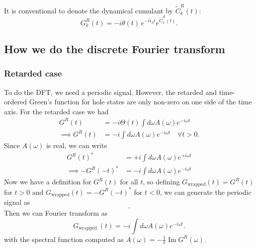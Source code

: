 It is conventional to denote the dynamical cumulant by $\tilde{C}_k^R(t)$:
\begin{equation}
G_k^R(t) = -i\theta(t)\, e^{-i \tilde{\epsilon}_k t} e^{\tilde{C}_k^R(t)}.
\end{equation}

\subsection{How we do the discrete Fourier transform}
\subsubsection{Retarded case}
\label{sec:ce-dft-retarded}
To do the DFT, we need a periodic signal. However, the retarded and time-ordered Green's function for hole states are only non-zero on one side of the time axis. For the retarded case we had 
\begin{align}
G^R(t)&=-i \Theta(t) \int d \omega A(\omega) e^{-i \omega t}\\
\implies G^R(t)&=-i \int d \omega A(\omega) e^{-i \omega t}\quad\forall t>0.
\end{align}
Since $A(\omega)$ is real, we can write
\begin{align}
    G^R(t)^*&=+i \int d \omega A(\omega) e^{+i \omega t}\\
\implies -G^R(-t)^*&=-i \int d \omega A(\omega) e^{-i \omega t}
\end{align}
Now we have a definition for $G^R(t)$ for all $t$, so defining $G_{\text{wrapped}}(t) = G^R(t)$ for $t>0$ and $G_{\text{wrapped}}(t) = -G^R(-t)^*$ for $t<0$, we can generate the periodic signal as
\begin{equation}
    [G^R(0), G^R(dt), \ldots, G^R(N dt), -G^R(-N dt)^*, \ldots, -G^R(-dt)^*].
\end{equation}
Then we can Fourier transform as
\begin{equation}
    G_{\text {wrapped }}(t)=-i \int d \omega A(\omega) e^{-i \omega t}.
\end{equation}
with the spectral function computed as $A(\omega) = -\frac{1}{\pi} \operatorname{Im} G^R(\omega)$.


